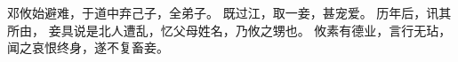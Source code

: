 
\switchcolumn*[\section{}]

邓攸始避难，于道中弃己子，全弟子。
既过江，取一妾，甚宠爱。
历年后，讯其所由，
妾具说是北人遭乱，忆父母姓名，乃攸之甥也。
攸素有德业，言行无玷，闻之哀恨终身，遂不复畜妾。

\switchcolumn


